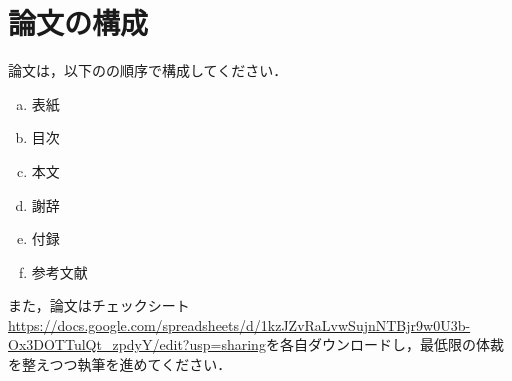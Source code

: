 
\chapter{論文の構成}\label{chap:論文の構成}

論文は，以下のの順序で構成してください．

	\begin{enumerate}[a.]
		\item 表紙 \label{term:a}
		\item 目次 \label{term:b}
		\item 本文 \label{term:c}
		\item 謝辞 \label{term:d}
		\item 付録 \label{term:e}
		\item 参考文献 \label{term:f}
	\end{enumerate}

また，論文はチェックシート\url{https://docs.google.com/spreadsheets/d/1kzJZvRaLvwSujnNTBjr9w0U3b-Ox3DOTTulQt_zpdyY/edit?usp=sharing}を各自ダウンロードし，最低限の体裁を整えつつ執筆を進めてください．
